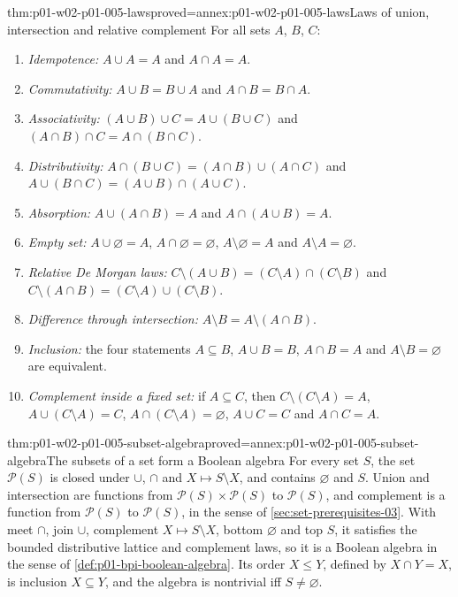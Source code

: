 \begin{hbtheorem}{thm:p01-w02-p01-005-laws}{proved=annex:p01-w02-p01-005-laws}{Laws of union, intersection and relative complement}
For all sets \(A\), \(B\), \(C\):
\begin{enumerate}
  \item \emph{Idempotence:} \(A\cup A=A\) and \(A\cap A=A\).
  \item \emph{Commutativity:} \(A\cup B=B\cup A\) and \(A\cap B=B\cap A\).
  \item \emph{Associativity:} \((A\cup B)\cup C=A\cup(B\cup C)\) and
        \((A\cap B)\cap C=A\cap(B\cap C)\).
  \item \emph{Distributivity:} \(A\cap(B\cup C)=(A\cap B)\cup(A\cap C)\) and
        \(A\cup(B\cap C)=(A\cup B)\cap(A\cup C)\).
  \item \emph{Absorption:} \(A\cup(A\cap B)=A\) and \(A\cap(A\cup B)=A\).
  \item \emph{Empty set:} \(A\cup\varnothing=A\), \(A\cap\varnothing=\varnothing\),
        \(A\setminus\varnothing=A\) and \(A\setminus A=\varnothing\).
  \item \emph{Relative De Morgan laws:}
        \(C\setminus(A\cup B)=(C\setminus A)\cap(C\setminus B)\) and
        \(C\setminus(A\cap B)=(C\setminus A)\cup(C\setminus B)\).
  \item \emph{Difference through intersection:}
        \(A\setminus B=A\setminus(A\cap B)\).
  \item \emph{Inclusion:} the four statements \(A\subseteq B\),
        \(A\cup B=B\), \(A\cap B=A\) and \(A\setminus B=\varnothing\) are
        equivalent.
  \item \emph{Complement inside a fixed set:} if \(A\subseteq C\), then
        \(C\setminus(C\setminus A)=A\), \(A\cup(C\setminus A)=C\),
        \(A\cap(C\setminus A)=\varnothing\), \(A\cup C=C\) and \(A\cap C=A\).
\end{enumerate}
\end{hbtheorem}

\begin{hbcorollary}{thm:p01-w02-p01-005-subset-algebra}{proved=annex:p01-w02-p01-005-subset-algebra}{The subsets of a set form a Boolean algebra}
For every set \(S\), the set \(\mathcal P(S)\) is closed under \(\cup\),
\(\cap\) and \(X\mapsto S\setminus X\), and contains \(\varnothing\) and \(S\).
Union and intersection are functions from \(\mathcal P(S)\times\mathcal P(S)\)
to \(\mathcal P(S)\), and complement is a function from \(\mathcal P(S)\) to
\(\mathcal P(S)\), in the sense of \cref{sec:set-prerequisites-03}. With
meet \(\cap\), join \(\cup\), complement \(X\mapsto S\setminus X\), bottom
\(\varnothing\) and top \(S\), it satisfies the bounded distributive lattice
and complement laws, so it is a Boolean algebra in the sense of
\cref{def:p01-bpi-boolean-algebra}. Its order \(X\leq Y\), defined by
\(X\cap Y=X\), is inclusion \(X\subseteq Y\), and the algebra is nontrivial iff
\(S\neq\varnothing\).
\end{hbcorollary}

